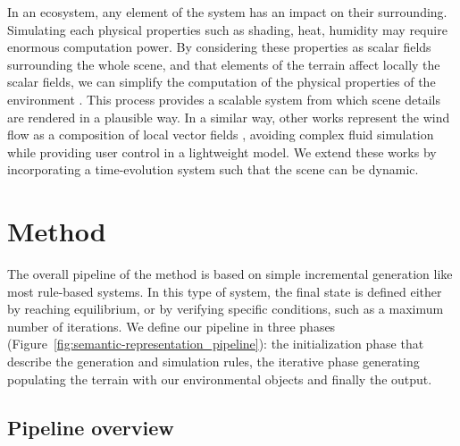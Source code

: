 In an ecosystem, any element of the system has an impact on their surrounding. Simulating each physical properties such as shading, heat, humidity may require enormous computation power. By considering these properties as scalar fields surrounding the whole scene, and that elements of the terrain affect locally the scalar fields, we can simplify the computation of the physical properties of the environment \cite{Grosbellet2016, Guerin2016a}. This process provides a scalable system from which scene details are rendered in a plausible way. In a similar way, other works represent the wind flow as a composition of local vector fields \cite{Wejchert1991}, avoiding complex fluid simulation while providing user control in a lightweight model. We extend these works by incorporating a time-evolution system such that the scene can be dynamic.


\section{Method}
\label{sec:semantic-representation_method}
The overall pipeline of the method is based on simple incremental generation like most rule-based systems. In this type of system, the final state is defined either by reaching equilibrium, or by verifying specific conditions, such as a maximum number of iterations. 
We define our pipeline in three phases (Figure~\ref{fig:semantic-representation_pipeline}): the initialization phase that describe the generation and simulation rules, the iterative phase generating populating the terrain with our environmental objects and finally the output.


\subsection{Pipeline overview}
\label{sec:semantic-representation_pipeline}

